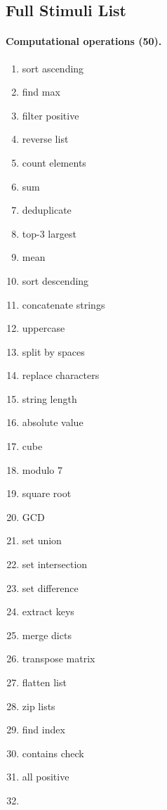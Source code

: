 \documentclass[11pt]{article}
\theoremstyle{definition}
\begin{document}
\subsection{Full Stimuli List}

\paragraph{Computational operations (50).}
\small
\begin{enumerate}[nosep]
\item sort ascending \item find max \item filter positive \item reverse list \item count elements \item sum \item deduplicate \item top-3 largest \item mean \item sort descending \item concatenate strings \item uppercase \item split by spaces \item replace characters \item string length \item absolute value \item cube \item modulo 7 \item square root \item GCD \item set union \item set intersection \item set difference \item extract keys \item merge dicts \item transpose matrix \item flatten list \item zip lists \item find index \item contains check \item all positive \item
\end{enumerate}
\end{document}
